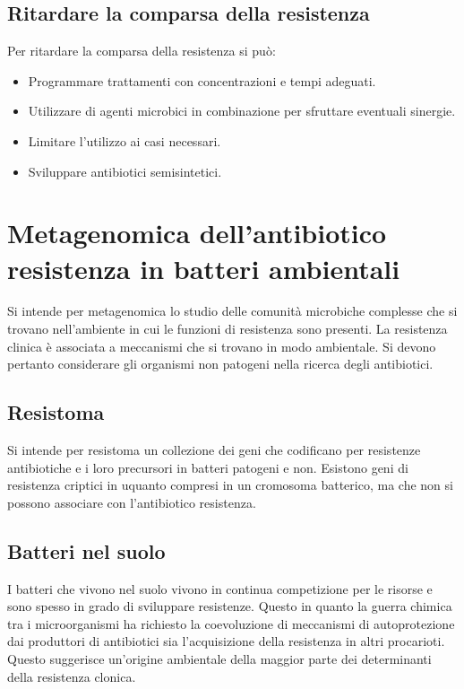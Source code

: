 	\subsection{Ritardare la comparsa della resistenza}
	Per ritardare la comparsa della resistenza si pu\`o:
	\begin{multicols}{2}
		\begin{itemize}
			\item Programmare trattamenti con concentrazioni e tempi adeguati.
			\item Utilizzare di agenti microbici in combinazione per sfruttare eventuali sinergie.
			\item Limitare l'utilizzo ai casi necessari.
			\item Sviluppare antibiotici semisintetici.
		\end{itemize}
	\end{multicols}

\section{Metagenomica dell'antibiotico resistenza in batteri ambientali}
Si intende per metagenomica lo studio delle comunit\`a microbiche complesse che si trovano nell'ambiente in cui le funzioni di resistenza sono presenti.
La resistenza clinica \`e associata a meccanismi che si trovano in modo ambientale.
Si devono pertanto considerare gli organismi non patogeni nella ricerca degli antibiotici.

	\subsection{Resistoma}
	Si intende per resistoma un collezione dei geni che codificano per resistenze antibiotiche e i loro precursori in batteri patogeni e non.
	Esistono geni di resistenza criptici in uquanto compresi in un cromosoma batterico, ma che non si possono associare con l'antibiotico resistenza.

	\subsection{Batteri nel suolo}
	I batteri che vivono nel suolo vivono in continua competizione per le risorse e sono spesso in grado di sviluppare resistenze.
	Questo in quanto la guerra chimica tra i microorganismi ha richiesto la coevoluzione di meccanismi di autoprotezione dai produttori di antibiotici sia l'acquisizione della resistenza in altri procarioti.
	Questo suggerisce un'origine ambientale della maggior parte dei determinanti della resistenza clonica.

